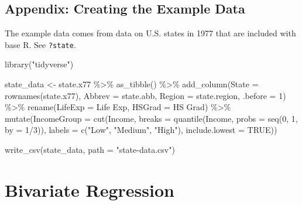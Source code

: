 \documentclass[
  12pt,
  oneside,openany]{book}
\newenvironment{Shaded}{\begin{snugshade}}{\end{snugshade}}
\newcommand{\AttributeTok}[1]{\textcolor[rgb]{0.77,0.63,0.00}{#1}}
\newcommand{\ConstantTok}[1]{\textcolor[rgb]{0.00,0.00,0.00}{#1}}
\newcommand{\DecValTok}[1]{\textcolor[rgb]{0.00,0.00,0.81}{#1}}
\newcommand{\FunctionTok}[1]{\textcolor[rgb]{0.00,0.00,0.00}{#1}}
\newcommand{\NormalTok}[1]{#1}
\newcommand{\OtherTok}[1]{\textcolor[rgb]{0.56,0.35,0.01}{#1}}
\newcommand{\SpecialCharTok}[1]{\textcolor[rgb]{0.00,0.00,0.00}{#1}}
\newcommand{\StringTok}[1]{\textcolor[rgb]{0.31,0.60,0.02}{#1}}
\begin{document}
\hypertarget{appendix-creating-the-example-data-1}{%
\section{Appendix: Creating the Example Data}\label{appendix-creating-the-example-data-1}}

The example data comes from data on U.S. states in 1977 that are included with base R. See \texttt{?state}.

\begin{Shaded}
\begin{Highlighting}[]
\FunctionTok{library}\NormalTok{(}\StringTok{"tidyverse"}\NormalTok{)}

\NormalTok{state\_data }\OtherTok{\textless{}{-}}\NormalTok{ state.x77 }\SpecialCharTok{\%\textgreater{}\%}
  \FunctionTok{as\_tibble}\NormalTok{() }\SpecialCharTok{\%\textgreater{}\%}
  \FunctionTok{add\_column}\NormalTok{(}\AttributeTok{State =} \FunctionTok{rownames}\NormalTok{(state.x77),}
             \AttributeTok{Abbrev =}\NormalTok{ state.abb,}
             \AttributeTok{Region =}\NormalTok{ state.region,}
             \AttributeTok{.before =} \DecValTok{1}\NormalTok{) }\SpecialCharTok{\%\textgreater{}\%}
  \FunctionTok{rename}\NormalTok{(}\AttributeTok{LifeExp =} \StringTok{\textasciigrave{}}\AttributeTok{Life Exp}\StringTok{\textasciigrave{}}\NormalTok{,}
         \AttributeTok{HSGrad =} \StringTok{\textasciigrave{}}\AttributeTok{HS Grad}\StringTok{\textasciigrave{}}\NormalTok{) }\SpecialCharTok{\%\textgreater{}\%}
  \FunctionTok{mutate}\NormalTok{(}\AttributeTok{IncomeGroup =} \FunctionTok{cut}\NormalTok{(Income,}
                           \AttributeTok{breaks =} \FunctionTok{quantile}\NormalTok{(Income,}
                                             \AttributeTok{probs =} \FunctionTok{seq}\NormalTok{(}\DecValTok{0}\NormalTok{, }\DecValTok{1}\NormalTok{, }\AttributeTok{by =} \DecValTok{1}\SpecialCharTok{/}\DecValTok{3}\NormalTok{)),}
                           \AttributeTok{labels =} \FunctionTok{c}\NormalTok{(}\StringTok{"Low"}\NormalTok{, }\StringTok{"Medium"}\NormalTok{, }\StringTok{"High"}\NormalTok{),}
                           \AttributeTok{include.lowest =} \ConstantTok{TRUE}\NormalTok{))}

\FunctionTok{write\_csv}\NormalTok{(state\_data, }\AttributeTok{path =} \StringTok{"state{-}data.csv"}\NormalTok{)}
\end{Highlighting}
\end{Shaded}

\hypertarget{bivariate}{%
\chapter{Bivariate Regression}\label{bivariate}}
\end{document}

